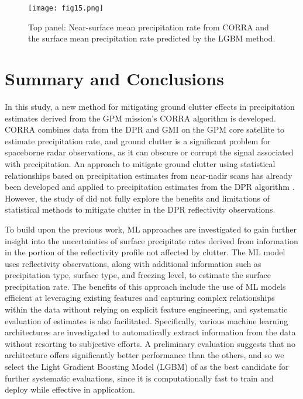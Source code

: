 \documentclass{ametsocV6.1} %
\begin{document}
\begin{center}
\begin{figure}
\begin{center}
\texttt{[image: fig15.png]}
 \caption{Top panel: Near-surface mean precipitation rate from CORRA and the surface mean precipitation rate predicted by the LGBM method.}
\label{fig:figCONUSPrecipUncond}
\end{center}
\end{figure}
\end{center}

\section {Summary and Conclusions}

In this study, a new method for mitigating ground clutter effects in precipitation estimates derived from the GPM mission's CORRA algorithm is developed. CORRA combines data from the DPR and GMI on the GPM core satellite to estimate precipitation rate, and ground clutter is a significant problem for spaceborne radar observations, as it can obscure or corrupt the signal associated with precipitation. An approach to mitigate ground clutter using statistical relationships based on precipitation estimates from near-nadir scans has already been developed \citep{hirose2021} and applied to precipitation estimates from the DPR algorithm \citep{iguchi_atbd}. However, the study of \cite{hirose2021} did not fully explore the benefits and limitations of statistical methods to mitigate clutter in the DPR reflectivity observations. 

To build upon the previous work, ML approaches are investigated to gain further insight into the uncertainties of surface precipitate rates derived from information in the portion of the reflectivity profile not affected by clutter. The ML model uses reflectivity observations, along with additional information such as precipitation type, surface type, and freezing level, to estimate the surface precipitation rate. The benefits of this approach include the use of ML models efficient at leveraging existing features and capturing complex relationships within the data without relying on explicit feature engineering, and systematic evaluation of estimates is also facilitated. Specifically, various machine learning architectures are investigated to automatically extract information from the data without resorting to subjective efforts. A preliminary evaluation suggests that no architecture offers significantly better performance than the others, and so we select the Light Gradient Boosting Model (LGBM) of \cite{ke2017} as the best candidate for further systematic evaluations, since it is computationally fast to train and deploy while effective in application.
\end{document}
